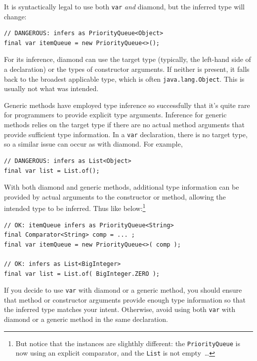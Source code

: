 It is syntactically legal to use both \lstinline|var| \textit{and} diamond, but the inferred type will change:
\begin{lstlisting}
// DANGEROUS: infers as PriorityQueue<Object>
final var itemQueue = new PriorityQueue<>();
\end{lstlisting}

For its inference, diamond can use the target type (typically, the left-hand side of a declaration) or the types of constructor arguments. If neither is present, it falls back to the broadest applicable type, which is often \lstinline|java.lang.Object|. This is usually not what was intended.

Generic methods have employed type inference so successfully that it’s quite rare for programmers to provide explicit type arguments. Inference for generic methods relies on the target type if there are no actual method arguments that provide sufficient type information. In a \lstinline|var| declaration, there is no target type, so a similar issue can occur as with diamond. For example,
\begin{lstlisting}
// DANGEROUS: infers as List<Object>
final var list = List.of();
\end{lstlisting}

With both diamond and generic methods, additional type information can be provided by actual arguments to the constructor or method, allowing the intended type to be inferred. Thus like below:\footnote{But notice that the instances are slighthly different: the \lstinline|PriorityQueue| is now using an explicit comparator, and the \lstinline|List| is not empty~…}
\begin{lstlisting}
// OK: itemQueue infers as PriorityQueue<String>
final Comparator<String> comp = ... ;
final var itemQueue = new PriorityQueue<>( comp );

// OK: infers as List<BigInteger>
final var list = List.of( BigInteger.ZERO );
\end{lstlisting}

If you decide to use \lstinline|var| with diamond or a generic method, you should ensure that method or constructor arguments provide enough type information so that the inferred type matches your intent. Otherwise, avoid using both \lstinline|var| with diamond or a generic method in the same declaration.


